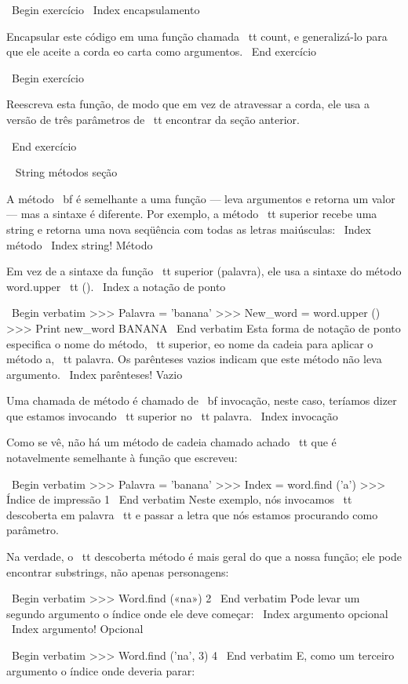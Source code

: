 \documentclass[10pt]{book}
\begin{document}
\begin {itemize}
{{{{{\ Begin {} exercício
\ Index {} encapsulamento

Encapsular este código em uma função chamada {\ tt
count}, e generalizá-lo para que ele aceite a corda eo
carta como argumentos.
\ End {} exercício

\ Begin {} exercício

Reescreva esta função, de modo que em vez de
atravessar a corda, ele usa a versão de três parâmetros de {\ tt
encontrar} da seção anterior.

\ End {} exercício


\ {} String métodos seção

A {método \ bf} é semelhante a uma função --- leva argumentos e
retorna um valor --- mas a sintaxe é diferente. Por exemplo, a
método {\ tt superior} recebe uma string e retorna uma nova seqüência com
todas as letras maiúsculas:
\ Index {método}
\ Index {string! Método}

Em vez de a sintaxe da função {\ tt superior (palavra)}, ele usa
a sintaxe do método {word.upper \ tt ()}.
\ Index {} a notação de ponto

\ Begin {verbatim}
>>> Palavra = 'banana'
>>> New_word = word.upper ()
>>> Print new_word
BANANA
\ End {verbatim}
%
Esta forma de notação de ponto especifica o nome do método, {\ tt
superior}, eo nome da cadeia para aplicar o método a, {\ tt
palavra}. Os parênteses vazios indicam que este método não leva
argumento.
\ Index {parênteses! Vazio}

Uma chamada de método é chamado de {\ bf invocação}, neste caso, teríamos
dizer que estamos invocando {\ tt superior} no {\ tt palavra}.
\ Index {} invocação

Como se vê, não há um método de cadeia chamado {achado \ tt} que
é notavelmente semelhante à função que escreveu:

\ Begin {verbatim}
>>> Palavra = 'banana'
>>> Index = word.find ('a')
>>> Índice de impressão
1
\ End {verbatim}
%
Neste exemplo, nós invocamos {\ tt descoberta} em {palavra \ tt} e passar
a letra que nós estamos procurando como parâmetro.

Na verdade, o {\ tt descoberta} método é mais geral do que a nossa função;
ele pode encontrar substrings, não apenas personagens:

\ Begin {verbatim}
>>> Word.find («na»)
2
\ End {verbatim}
%
Pode levar um segundo argumento o índice onde ele deve começar:
\ Index {argumento opcional}
\ Index {argumento! Opcional}

\ Begin {verbatim}
>>> Word.find ('na', 3)
4
\ End {verbatim}
%
E, como um terceiro argumento o índice onde deveria parar:

}}}}}
\end{itemize}
\end{document}
